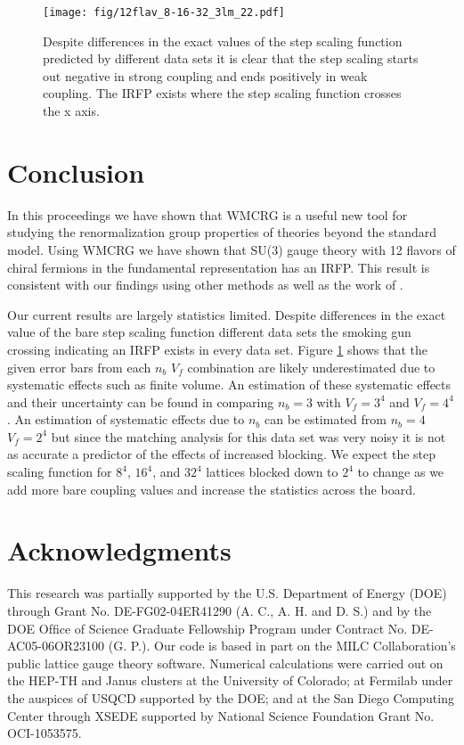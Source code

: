 \documentclass{PoS}
\begin{document}
\begin{figure}[th]
  \centering
  \texttt{[image: fig/12flav\_8-16-32\_3lm\_22.pdf]}
  \caption{Despite differences in the exact values of the step scaling function predicted by different data sets it is clear that the step scaling starts out negative in strong coupling and ends positively in weak coupling.  The IRFP exists where the step scaling function crosses the x axis.}
  \label{fig:scheme7}
\end{figure}

\section{Conclusion}
\label{sec:conclusion}
In this proceedings we have shown that WMCRG is a useful new tool for studying the renormalization group properties of theories beyond the standard model.
Using WMCRG we have shown that SU(3) gauge theory with 12 flavors of chiral fermions in the fundamental representation has an IRFP.
This result is consistent with our findings using other methods as well as the work of \cite{}.


Our current results are largely statistics limited.
Despite differences in the exact value of the bare step scaling function different data sets the smoking gun crossing indicating an IRFP exists in every data set.
Figure \ref{fig:scheme7} shows that the given error bars from each $n_b$ $V_f$ combination are likely underestimated due to systematic effects such as finite volume.
An estimation of these systematic effects and their uncertainty can be found in comparing $n_b=3$ with $V_f=3^4$ and $V_f=4^4$.
An estimation of systematic effects due to $n_b$ can be estimated from $n_b=4$ $V_f=2^4$ but since the matching analysis for this data set was very noisy it is not as accurate a predictor of the effects of increased blocking.
We expect the step scaling function for  $8^4$, $16^4$, and $32^4$ lattices blocked down to $2^4$ to change as we add more bare coupling values and increase the statistics across the board.

\section{Acknowledgments}
\label{sec:acknowledgments}
This research was partially supported by the U.S. Department of Energy (DOE) through Grant No. DE-FG02-04ER41290 (A. C., A. H. and D. S.) and by the DOE Ofﬁce of Science Graduate Fellowship Program under Contract No. DE-AC05-06OR23100 (G. P.). 
Our code is based in part on the MILC Collaboration’s public lattice gauge theory software.
Numerical calculations were carried out on the HEP-TH and Janus clusters at the University of Colorado; at Fermilab under the auspices of USQCD supported by the DOE; and at the San Diego Computing Center through XSEDE supported by National Science Foundation Grant No. OCI-1053575.



\end{document}
